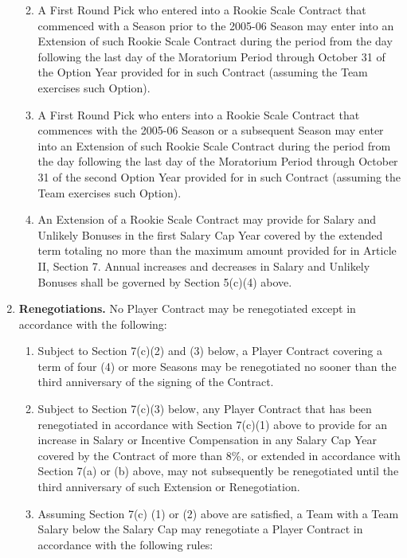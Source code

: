 \documentclass[
]{book}
\providecommand{\tightlist}{%
  \setlength{\itemsep}{0pt}\setlength{\parskip}{0pt}}
\begin{document}
\begin{enumerate}
  \begin{enumerate}
  \def\labelenumii{(\arabic{enumii})}
  \tightlist
  \item
    A First Round Pick who entered into a Rookie Scale Contract that commenced with a Season prior to the 2005-06 Season may enter into an Extension of such Rookie Scale Contract during the period from the day following the last day of the Moratorium Period through October 31 of the Option Year provided for in such Contract (assuming the Team exercises such Option).
  \item
    A First Round Pick who enters into a Rookie Scale Contract that commences with the 2005-06 Season or a subsequent Season may enter into an Extension of such Rookie Scale Contract during the period from the day following the last day of the Moratorium Period through October 31 of the second Option Year provided for in such Contract (assuming the Team exercises such Option).
  \item
    An Extension of a Rookie Scale Contract may provide for Salary and Unlikely Bonuses in the first Salary Cap Year covered by the extended term totaling no more than the maximum amount provided for in Article II, Section 7. Annual increases and decreases in Salary and Unlikely Bonuses shall be governed by Section 5(c)(4) above.
  \end{enumerate}
\item
  \textbf{Renegotiations.} No Player Contract may be renegotiated except in accordance with the following:

  \begin{enumerate}
  \def\labelenumii{(\arabic{enumii})}
  \tightlist
  \item
    Subject to Section 7(c)(2) and (3) below, a Player Contract covering a term of four (4) or more Seasons may be renegotiated no sooner than the third anniversary of the signing of the Contract.
  \item
    Subject to Section 7(c)(3) below, any Player Contract that has been renegotiated in accordance with Section 7(c)(1) above to provide for an increase in Salary or Incentive Compensation in any Salary Cap Year covered by the Contract of more than 8\%, or extended in accordance with Section 7(a) or (b) above, may not subsequently be renegotiated until the third anniversary of such Extension or Renegotiation.
  \item
    Assuming Section 7(c) (1) or (2) above are satisfied, a Team with a Team Salary below the Salary Cap may renegotiate a Player Contract in accordance with the following rules:


\end{enumerate}
\end{enumerate}
\end{document}
